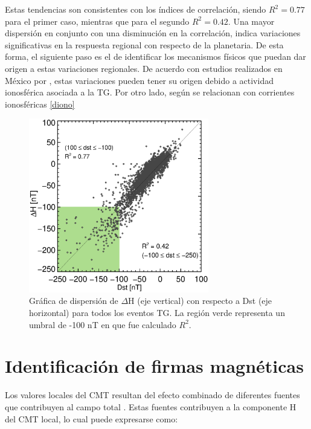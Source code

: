 Estas tendencias son consistentes con los índices de correlación, siendo $R^2=0.77$ para el primer caso, mientras que para el segundo $R^2=0.42$. Una mayor dispersión en conjunto con una disminución en la correlación, indica variaciones significativas en la respuesta regional con respecto de la planetaria. De esta forma, el siguiente paso es el de identificar los mecanismos físicos que puedan dar origen a estas variaciones regionales. De acuerdo con estudios realizados en México por \cite{dramaria_1, dramaria7, P-corona1, P-corona2}, estas variaciones pueden tener su origen debido a actividad ionosférica asociada a la TG. Por otro lado, según \cite{ddyn2005, angeoddyn, amorymazaudier_2017, amory2020_filtros} se relacionan con corrientes ionosféricas \ref{diono}

\begin{figure}
    \centering
     \includegraphics[width=0.7\textwidth]{Images/dispersion_general_dst.eps}
      \caption{Gráfica de dispersión de $\Delta$H (eje vertical) con respecto a Dst (eje horizontal) para todos los eventos TG. La región verde representa un umbral de -100 nT en que fue calculado $R^2$.}
       \label{fig:disp}
\end{figure}


\section{Identificación de firmas magnéticas}

Los valores locales del CMT resultan del efecto combinado de diferentes fuentes que contribuyen al campo total \cite{iaga_guide, 1969intro_to_iono_p, l_handbook_geof_sw_Geom_field, baseline_Gjerloev, vanKampt}. Estas fuentes contribuyen a la componente H del CMT local, lo cual puede expresarse como:


